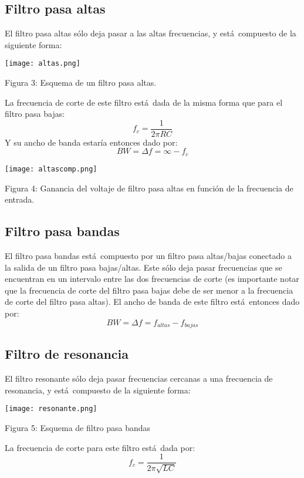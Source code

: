 \documentclass[11pt]{article}
\renewcommand{\=}[1]{\stackrel{#1}{=}} %
\theoremstyle{definition}
\theoremstyle{remark}
\begin{document}
\subsection*{Filtro pasa altas}
El filtro pasa altas s\'olo deja pasar a las altas frecuencias, y est\'a\ compuesto de la siguiente forma:
\begin{center}
\texttt{[image: altas.png]}
\end{center}
\begin{center}
Figura 3: Esquema de un filtro pasa altas.
\end{center}
La frecuencia de corte de este filtro est\'a\ dada de la misma forma que para el filtro pasa bajas:
\begin{equation}
f_c=\frac{1}{2\pi RC}
\end{equation}
Y su ancho de banda estar\'ia entonces dado por:
\begin{equation}
BW=\Delta f=\infty-f_c
\end{equation}
\begin{center}
\texttt{[image: altascomp.png]}
\end{center}
\begin{center}
Figura 4: Ganancia del voltaje de filtro pasa altas en funci\'on de la frecuencia de entrada.
\end{center}

\subsection*{Filtro pasa bandas}
El filtro pasa bandas est\'a\ compuesto por un filtro pasa altas/bajas conectado a la salida de un filtro pasa bajas/altas. Este s\'olo deja pasar frecuencias que se encuentran en un intervalo entre las dos frecuencias de corte (es importante notar que la frecuencia de corte del filtro pasa bajas debe de ser menor a la frecuencia de corte del filtro pasa altas).
El ancho de banda de este filtro est\'a\ entonces dado por:
\begin{equation}
BW=\Delta f=f_{altas}-f_{bajas}
\end{equation}

\subsection*{Filtro de resonancia}
El filtro resonante s\'olo deja pasar frecuencias cercanas a una frecuencia de resonancia, y est\'a\ compuesto de la siguiente forma:
\begin{center}
\texttt{[image: resonante.png]}
\end{center}
\begin{center}
Figura 5: Esquema de filtro pasa bandas
\end{center}
La frecuencia de corte para este filtro est\'a\ dada por:
\begin{equation}
f_c=\frac{1}{2\pi \sqrt{LC}}
\end{equation}
\end{document}
